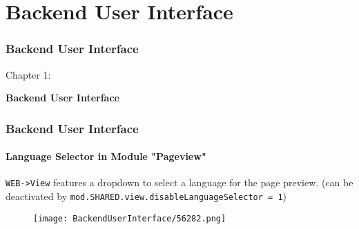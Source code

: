 %

\section{Backend User Interface}
\begin{frame}[fragile]
	\frametitle{Backend User Interface}

	\begin{center}\huge{Chapter 1:}\end{center}
	\begin{center}\huge{\color{typo3darkgrey}\textbf{Backend User Interface}}\end{center}

\end{frame}

\begin{frame}[fragile]
	\frametitle{Backend User Interface}
	\framesubtitle{Language Selector in Module "Pageview"}


	\texttt{WEB->View} features a dropdown to select a language for the page preview.\newline
	\smaller
		(can be deactivated by \texttt{mod.SHARED.view.disableLanguageSelector = 1})
	\normalsize

	\begin{figure}
		\texttt{[image: BackendUserInterface/56282.png]}
	\end{figure}

\end{frame}

